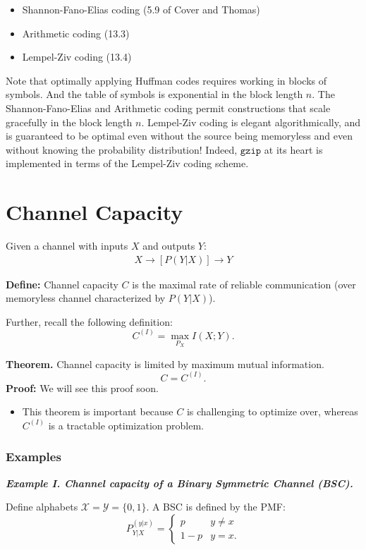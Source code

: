 \documentclass[12pt]{extarticle}
\newcommand{\eq}[1]{\begin{align*}#1\end{align*}}
\begin{document}
\begin{itemize}
  \item Shannon-Fano-Elias coding (5.9 of Cover and Thomas)
  \item Arithmetic coding (13.3)
  \item Lempel-Ziv coding (13.4)
\end{itemize}

Note that optimally applying Huffman codes requires working in blocks of symbols.  And the table of symbols is exponential in the block length $n$.  The Shannon-Fano-Elias and Arithmetic coding permit constructions that scale gracefully in the block length $n$.  Lempel-Ziv coding is elegant algorithmically, and is guaranteed to be optimal even without the source being memoryless and even without knowing the probability distribution!  Indeed, $\texttt{gzip}$ at its heart is implemented in terms of the Lempel-Ziv coding scheme.


\section{Channel Capacity}

Given a channel with inputs $X$ and outputs $Y$:
\eq{X \to [P(Y|X)] \to Y}

\textbf{Define:} Channel capacity $C$ is the maximal rate of reliable communication (over memoryless channel characterized by $P(Y|X)$).

Further, recall the following definition:
\[
C^{(I)} = \max_{P_X} I(X; Y).
\]

{\bf Theorem.} Channel capacity is limited by maximum mutual information. 
\[
C = C^{(I)}.
\]
\textbf{Proof: } We will see this proof soon. 

\begin{itemize}
\item This theorem is important because $C$ is challenging to optimize over, whereas $C^{(I)}$ is a tractable optimization problem.
\end{itemize}

\subsubsection{Examples}
\textbf{\textit{Example I. Channel capacity of a Binary Symmetric Channel (BSC).}}

Define alphabets $\mathcal{X} = \mathcal{Y} = \{ 0, 1 \}$. A BSC is defined by the PMF:
\[
P_{Y|X}^{(y|x)} = \begin{cases}
p & y \neq x \\ 
1 - p & y = x.
\end{cases}
\]
\end{document}
